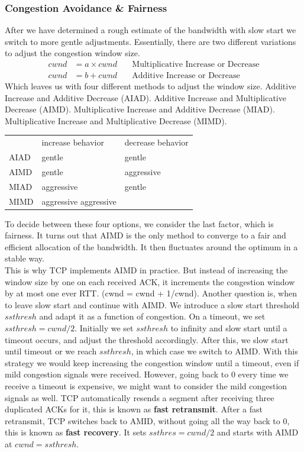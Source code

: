 \subsubsection{Congestion Avoidance \& Fairness}
After we have determined a rough estimate of the bandwidth with slow start we switch to more gentle adjustments. Essentially, there are two different variations to adjust the congestion window size. 
\begin{align*}
cwnd &= a \times cwnd \quad & \text{Multiplicative Increase or Decrease} \\
cwnd &= b + cwnd \quad & \text{Additive Increase or Decrease} 
\end{align*}
Which leaves us with four different methods to adjust the window size. Additive Increase and Additive Decrease (AIAD). Additive Increase and Multiplicative Decrease (AIMD). Multiplicative Increase and Additive Decrease (MIAD). Multiplicative Increase and Multiplicative Decrease (MIMD).
\begin{table}[]
\centering
\begin{tabular}{lll}
& {\color{gray} increase behavior} & {\color{gray} decrease behavior} \\
{\color{gray} AIAD} & gentle & gentle \\
{\color{gray} AIMD} & gentle & aggressive \\
{\color{gray} MIAD} & aggressive & gentle \\
{\color{gray} MIMD} & aggressive aggressive
\end{tabular}
\end{table}
To decide between these four options, we consider the last factor, which is fairness. It turns out that AIMD is the only method to converge to a fair and efficient allocation of the bandwidth. It then fluctuates around the optimum in a stable way. \vspace{.3cm}\\

This is why TCP implements AIMD in practice. But instead of increasing the window size by one on each received ACK, it increments the congestion window by at most one ever RTT. (cwnd = cwnd + 1/cwnd). 
Another question is, when to leave slow start and continue with AIMD. We introduce a slow start threshold $ssthresh$ and adapt it as a function of congestion. On a timeout, we set $ssthresh = cwnd/2$. Initially we set $ssthresh$ to infinity and slow start until a timeout occurs, and adjust the threshold accordingly. After this, we slow start until timeout or we reach $ssthresh$, in which case we switch to AIMD. With this strategy we would keep increasing the congestion window until a timeout, even if mild congestion signals were received. However, going back to 0 every time we receive a timeout is expensive, we might want to consider the mild congestion signals as well. TCP automatically resends a segment after receiving three duplicated ACKs for it, this is known as \textbf{fast retransmit}. After a fast retransmit, TCP switches back to AMID, without going all the way back to 0, this is known as \textbf{fast recovery}. It sets $ssthres = cwnd/2$ and starts with AIMD at $cwnd = ssthresh$.

